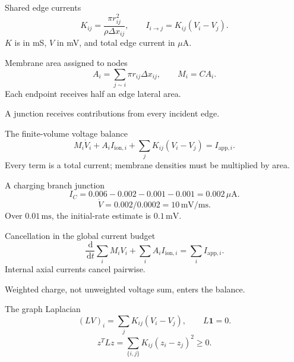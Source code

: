 \documentclass[aspectratio=169,11pt]{beamer}
\providecommand{\dd}{\,\mathrm{d}}\providecommand{\R}{\mathbb{R}}
\newcommand{\notestarget}{notes.pdf}\newcommand{\noteslabel}{Notes}
\begin{document}
\renewcommand{\notestarget}{notes.pdf\#note-a-conservative-network-discretization}
\begin{frame}[t,fragile,label=slide-shared-edge-currents]{Shared edge currents}
\[K_{ij}=\frac{\pi r_{ij}^2}{\rho\Delta x_{ij}},\qquad I_{i\to j}=K_{ij}(V_i-V_j).\]\pause{} $K$ is in mS, $V$ in mV, and total edge current in $\mu\mathrm A$.
\end{frame}
\renewcommand{\notestarget}{notes.pdf\#note-a-conservative-network-discretization}
\begin{frame}[t,fragile,label=slide-membrane-area-assigned-to-nodes]{Membrane area assigned to nodes}
\[A_i=\sum_{j\sim i}\pi r_{ij}\Delta x_{ij},\qquad M_i=CA_i.\]\pause{} Each endpoint receives half an edge lateral area.\par\medskip A junction receives contributions from every incident edge.
\end{frame}
\renewcommand{\notestarget}{notes.pdf\#note-a-conservative-network-discretization}
\begin{frame}[t,fragile,label=slide-the-finite-volume-voltage-balance]{The finite-volume voltage balance}
\[M_i\dot V_i+A_iI_{\mathrm{ion},i}+\sum_jK_{ij}(V_i-V_j)=I_{\mathrm{app},i}.\]\pause{} Every term is a total current; membrane densities must be multiplied by area.
\end{frame}
\renewcommand{\notestarget}{notes.pdf\#note-junction-storage-and-the-summed-current-budget}
\begin{frame}[t,fragile,label=slide-a-charging-branch-junction]{A charging branch junction}
\[I_C=0.006-0.002-0.001-0.001=0.002\,\mu\mathrm A.\]\pause{}\[\dot V=0.002/0.0002=10\,\mathrm{mV/ms}.\] Over $0.01\,\mathrm{ms}$, the initial-rate estimate is $0.1\,\mathrm{mV}$.
\end{frame}
\renewcommand{\notestarget}{notes.pdf\#note-junction-storage-and-the-summed-current-budget}
\begin{frame}[t,fragile,label=slide-cancellation-in-the-global-current-budget]{Cancellation in the global current budget}
\[\frac{\dd}{\dd t}\sum_iM_iV_i+\sum_iA_iI_{\mathrm{ion},i}=\sum_iI_{\mathrm{app},i}.\]\pause{} Internal axial currents cancel pairwise.\par\medskip Weighted charge, not unweighted voltage sum, enters the balance.
\end{frame}
\renewcommand{\notestarget}{notes.pdf\#note-the-coupled-implicit-voltage-solve}
\begin{frame}[t,fragile,label=slide-the-graph-laplacian]{The graph Laplacian}
\[(LV)_i=\sum_jK_{ij}(V_i-V_j),\qquad L\mathbf1=0.\]\pause{}\[z^TLz=\sum_{\{i,j\}}K_{ij}(z_i-z_j)^2\geq0.\]
\end{frame}
\end{document}
